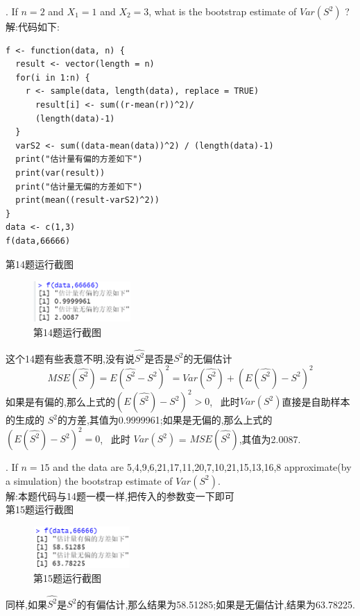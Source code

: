 \documentclass{book}
\begin{document}
. If $n = 2$ and $X_{1} = 1$ and $X_{2} = 3$, what is the bootstrap estimate of $Var(S^{2})$ ? \\
解:代码如下:
\lstset{language = R}
\begin{lstlisting}
f <- function(data, n) {
  result <- vector(length = n)
  for(i in 1:n) {
    r <- sample(data, length(data), replace = TRUE)
      result[i] <- sum((r-mean(r))^2)/
      (length(data)-1)
  }
  varS2 <- sum((data-mean(data))^2) / (length(data)-1)
  print("估计量有偏的方差如下")
  print(var(result)) 
  print("估计量无偏的方差如下")
  print(mean((result-varS2)^2))
}    
data <- c(1,3)
f(data,66666)
\end{lstlisting}
第14题运行截图
\begin{figure}[H]
    \centering
    \includegraphics*[height = 1.6cm, width = 3.7cm]{gramFile/第14题运行截图.PNG}
    \caption{第14题运行截图}
\end{figure}
这个14题有些表意不明,没有说$\hat{S^{2}}$是否是$S^{2}$的无偏估计
$$
    MSE(\hat{S^{2}}) = E(\hat{S^{2}}-S^{2})^{2} = Var(\hat{S^{2}}) + (E(\hat{S^{2}})-S^{2})^{2}
$$
如果是有偏的,那么上式的$(E(\hat{S^{2}})-S^{2})^{2} > 0$, \ 此时$Var(S^{2})$直接是自助样本的生成的
$S^{2}$的方差,其值为0.9999961;如果是无偏的,那么上式的$(E(\hat{S^{2}})-S^{2})^{2} = 0$, \ 此时
$Var(S^{2})$ = $MSE(\hat{S^{2}})$,其值为2.0087.

. If $n = 15$ and the data are 5,4,9,6,21,17,11,20,7,10,21,15,13,16,8 approximate(by a simulation)
the bootstrap estimate of $Var(S^{2})$. \\
解:本题代码与14题一模一样,把传入的参数变一下即可 \\
第15题运行截图
\begin{figure}[H]
    \centering
    \includegraphics*[height = 1.6cm, width = 3.7cm]{gramFile/第15题运行截图.PNG}
    \caption{第15题运行截图}
\end{figure}
\noindent
同样,如果$\hat{S^{2}}$是$S^{2}$的有偏估计,那么结果为58.51285;如果是无偏估计,结果为63.78225. \\
\end{document}
